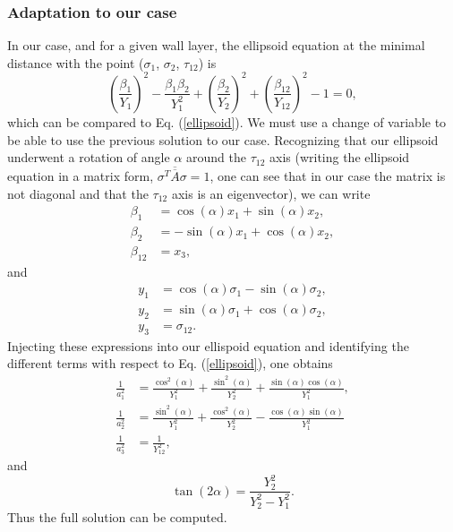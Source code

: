 \documentclass[]{article}
\begin{document}
\subsubsection{Adaptation to our case}
In our case, and for a given wall layer, the ellipsoid equation at the minimal distance with the point ($\sigma_1$, $\sigma_2$, $\tau_{12}$) is
\begin{equation}
		\left(\frac{\beta_1}{Y_1}\right)^2 - \frac{\beta_1 \beta_2}{Y_1^2} + \left(\frac{\beta_2}{Y_2}\right)^2 + \left(\frac{\beta_{12}}{Y_{12}}\right)^2 -1=0,
\end{equation}
which can be compared to Eq. (\ref{ellipsoid}).
We must use a change of variable to be able to use the previous solution to our case. Recognizing that our ellipsoid underwent a rotation of angle $\alpha$ around the $\tau_{12}$ axis (writing the ellipsoid equation in a matrix form, $\sigma^T\overline{\overline{A}}\sigma=1$, one can see that in our case the matrix is not diagonal and that the $\tau_{12}$ axis is an eigenvector), we can write
\begin{align}
	\beta_1 &= \cos(\alpha) x_1 + \sin({\alpha}) x_2, \nonumber \\
	\beta_2 &= -\sin(\alpha) x_1 + \cos(\alpha) x_2,  \\
	\beta_{12} &= x_3, \nonumber 
\end{align}
and
\begin{align}
	y_1 &= \cos(\alpha) \sigma_1 - \sin({\alpha}) \sigma_2, \nonumber \\
	y_2 &= \sin(\alpha) \sigma_1 + \cos(\alpha) \sigma_2,  \\
	y_3 &= \sigma_{12}. \nonumber 
\end{align}
Injecting these expressions into our ellispoid equation and identifying the different terms with respect to Eq. (\ref{ellipsoid}), one obtains
\begin{align}
	\frac{1}{a_1^2} &= \frac{\cos^2(\alpha)}{Y_1^2} + \frac{\sin^2(\alpha)}{Y_2^2}+\frac{\sin(\alpha)\cos(\alpha)}{Y_1^2}, \nonumber \\
	\frac{1}{a_2^2} &= \frac{\sin^2(\alpha)}{Y_1^2} + \frac{\cos^2(\alpha)}{Y_2^2}-\frac{\cos(\alpha)\sin(\alpha)}{Y_1^2} \\
	\frac{1}{a_3^2} &= \frac{1}{Y_{12}^2}, \nonumber 
\end{align}
and
\begin{equation}
	\tan(2\alpha)=\frac{Y_2^2}{Y_2^2-Y_1^2}.
\end{equation}
Thus the full solution can be computed.
\end{document}
